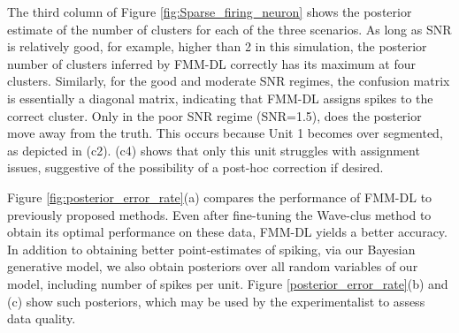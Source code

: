 \documentclass[journal]{IEEEtran}
\begin{document}
The third column of Figure \ref{fig:Sparse_firing_neuron} shows the posterior estimate of the number of clusters for each of the three scenarios.  As long as SNR is relatively good, for example, higher than 2 in this simulation, the posterior number of clusters inferred by FMM-DL correctly has its maximum at four clusters.  Similarly, for the good and moderate SNR regimes, the confusion matrix is essentially a diagonal matrix, indicating that FMM-DL assigns spikes to the correct cluster.  Only in the poor SNR regime (SNR=1.5), does the posterior move away from the truth.  This occurs because Unit 1 becomes over segmented, as depicted in (c2).  (c4) shows that only this unit struggles with assignment issues, suggestive of the possibility of a post-hoc correction if desired.

Figure \ref{fig:posterior_error_rate}(a) compares the performance of FMM-DL to previously proposed methods.  Even after fine-tuning the Wave-clus method to obtain its optimal performance on these data, FMM-DL yields a better accuracy.  
In addition to obtaining better point-estimates of spiking, via our Bayesian generative model, we also obtain posteriors over all random variables of our model, including number of spikes per unit.  Figure \ref{posterior_error_rate}(b) and (c) show such posteriors, which may be used by the experimentalist to assess data quality.

\end{document}
